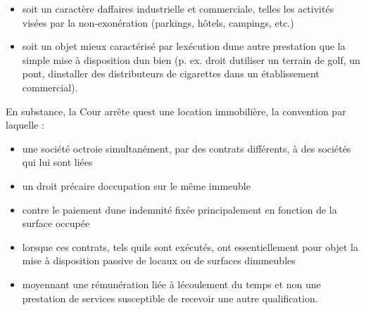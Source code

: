 \documentclass{book}
\begin{document}
\begin{itemize}
\item soit un caractère daffaires industrielle et commerciale, telles les activités visées par la non-exonération (parkings, hôtels, campings, etc.)
\item soit un objet mieux caractérisé par lexécution dune autre prestation que la simple mise à disposition dun bien (p. ex. droit dutiliser un terrain de golf, un pont, dinstaller des distributeurs de cigarettes dans un établissement commercial).
\end{itemize}
\null
En substance, la Cour arrête quest une location immobilière, la convention par laquelle :\\
\begin{itemize}
\item une société octroie simultanément, par des contrats différents, à des sociétés qui lui sont liées
\item un droit précaire doccupation sur le même immeuble
\item contre le paiement dune indemnité fixée principalement en fonction de la surface occupée
\item lorsque ces contrats, tels quils sont exécutés, ont essentiellement pour objet la mise à disposition passive de locaux ou de surfaces dimmeubles
\item moyennant une rémunération liée à lécoulement du temps et non une prestation de services susceptible de recevoir une autre qualification.
\end{itemize}
\null




   
\nocite{*}

\end{document}
